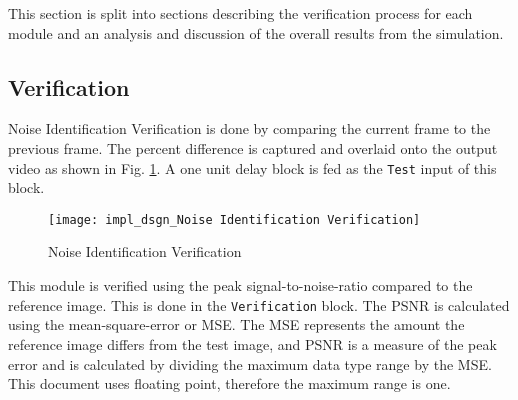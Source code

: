 This section is split into sections describing the verification process for each module and an analysis and discussion of the overall results from the simulation.
\subsection{Verification}
\par Noise Identification Verification is done by comparing the current frame to the previous frame. The percent difference is captured and overlaid onto the output video as shown in Fig. \ref{fig:noiseIDVer}. A one unit delay block is fed as the \verb!Test! input of this block.
 \begin{figure}[H]
    \texttt{[image: impl\_dsgn\_Noise Identification Verification]}
    \caption{Noise Identification Verification}
    \label{fig:noiseIDVer}
\end{figure}

\par This module is verified using the peak signal-to-noise-ratio compared to the reference image. This is done in the \verb!Verification! block. The PSNR is calculated using the mean-square-error or MSE. The MSE represents the amount the reference image differs from the test image, and PSNR is a measure of the peak error and is calculated by dividing the maximum data type range by the MSE. This document uses floating point, therefore the maximum range is one\cite{mathworks}.